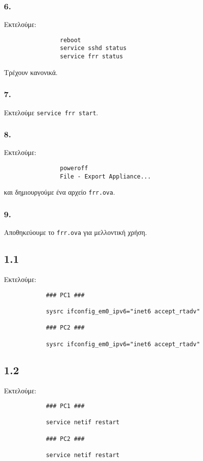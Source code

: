 \documentclass[a4paper, 12pt]{article}
\begin{document}
		\subsubsection*{6.}
			Εκτελούμε:
			
			\begin{verbatim}
				reboot
				service sshd status
				service frr status
			\end{verbatim}
			
			Τρέχουν κανονικά.

		\subsubsection*{7.}
			Εκτελούμε \verb|service frr start|.

		\subsubsection*{8.}
			Εκτελούμε: 
			
			\begin{verbatim}
				poweroff
				File - Export Appliance...
			\end{verbatim}
			
			και δημιουργούμε ένα αρχείο \verb|frr.ova|.

		\subsubsection*{9.}
			Αποθηκεύουμε το \verb|frr.ova| για μελλοντική χρήση.
		
	\subsection*{1.1}
		Εκτελούμε:
		
		\begin{verbatim}
			### PC1 ###
			
			sysrc ifconfig_em0_ipv6="inet6 accept_rtadv" 
			
			### PC2 ###

			sysrc ifconfig_em0_ipv6="inet6 accept_rtadv" 
		\end{verbatim}

	\subsection*{1.2}
		Εκτελούμε:
		
		\begin{verbatim}
			### PC1 ###
			
			service netif restart
			
			### PC2 ###
			
			service netif restart
		\end{verbatim}
\end{document}
